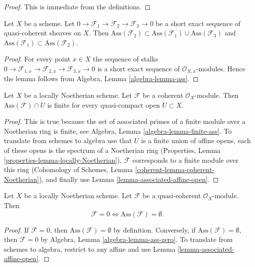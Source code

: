 \begin{proof}
This is immediate from the definitions.
\end{proof}

\begin{lemma}
\label{lemma-ses-ass}
Let $X$ be a scheme.
Let $0 \to \mathcal{F}_1 \to \mathcal{F}_2 \to \mathcal{F}_3 \to 0$
be a short exact sequence of quasi-coherent sheaves on $X$.
Then
$\text{Ass}(\mathcal{F}_2) \subset
\text{Ass}(\mathcal{F}_1) \cup \text{Ass}(\mathcal{F}_3)$
and
$\text{Ass}(\mathcal{F}_1) \subset \text{Ass}(\mathcal{F}_2)$.\
\end{lemma}

\begin{proof}
For every point $x \in X$ the sequence of stalks
$0 \to \mathcal{F}_{1, x} \to \mathcal{F}_{2, x} \to \mathcal{F}_{3, x} \to 0$
is a short exact sequence of $\mathcal{O}_{X, x}$-modules.
Hence the lemma follows from
Algebra, Lemma \ref{algebra-lemma-ass}.
\end{proof}

\begin{lemma}
\label{lemma-finite-ass}
Let $X$ be a locally Noetherian scheme.
Let $\mathcal{F}$ be a coherent $\mathcal{O}_X$-module.
Then $\text{Ass}(\mathcal{F}) \cap U$ is finite for
every quasi-compact open $U \subset X$.
\end{lemma}

\begin{proof}
This is true because the set of associated primes of a finite module over
a Noetherian ring is finite, see
Algebra, Lemma \ref{algebra-lemma-finite-ass}.
To translate from schemes to algebra use that $U$ is a finite union of
affine opens, each of these opens is the spectrum of a Noetherian ring
(Properties, Lemma \ref{properties-lemma-locally-Noetherian}),
$\mathcal{F}$ corresponds to a finite module over this ring
(Cohomology of Schemes, Lemma \ref{coherent-lemma-coherent-Noetherian}),
and finally use
Lemma \ref{lemma-associated-affine-open}.
\end{proof}

\begin{lemma}
\label{lemma-ass-zero}
Let $X$ be a locally Noetherian scheme. Let $\mathcal{F}$ be a
quasi-coherent $\mathcal{O}_X$-module. Then
$$
\mathcal{F} = 0 \Leftrightarrow \text{Ass}(\mathcal{F}) = \emptyset.
$$
\end{lemma}

\begin{proof}
If $\mathcal{F} = 0$, then $\text{Ass}(\mathcal{F}) = \emptyset$
by definition. Conversely, if $\text{Ass}(\mathcal{F}) = \emptyset$,
then $\mathcal{F} = 0$ by
Algebra, Lemma \ref{algebra-lemma-ass-zero}.
To translate from schemes to algebra, restrict to any affine and use
Lemma \ref{lemma-associated-affine-open}.
\end{proof}

